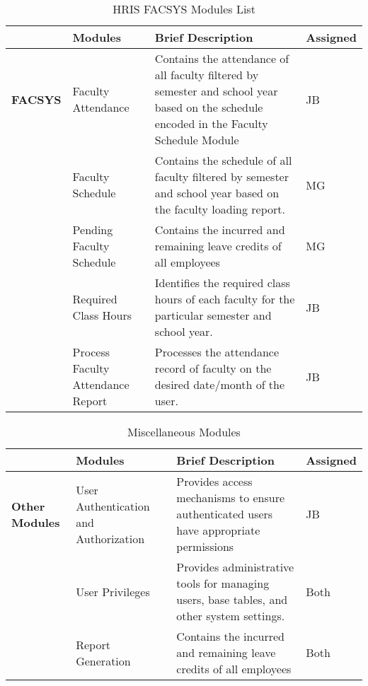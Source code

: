 \begin{table}[H]
    \begin{tabularx}{\textwidth}{|p{2cm}|p{3.5cm}|X|p{1.5cm}|}
    \toprule
    \multicolumn{1}{|l|}{} & \textbf{Modules}               & \textbf{Brief Description}                                                                                                                & \textbf{Assigned} \\ \midrule
    \textbf{FACSYS}     & Faculty Attendance                & Contains the attendance of all faculty filtered by semester and school year based on the schedule encoded in the Faculty Schedule Module  & JB                 \\
                        & Faculty Schedule                  & Contains the schedule of all faculty filtered by semester and school year based on the faculty loading report.                            & MG                 \\
                        & Pending Faculty Schedule          & Contains the incurred and remaining leave credits of all employees                                                                        & MG                 \\
                        & Required Class Hours              & Identifies the required class hours of each faculty for the particular semester and school year.                                          & JB                 \\
                        & Process Faculty Attendance Report & Processes the attendance record of faculty on the desired date/month of the user.                                                         & JB                 \\ \bottomrule
    \end{tabularx}
    \caption{HRIS FACSYS Modules List}
    \label{tab:hris-facsys-modules}
\end{table}

\begin{table}[H]
    \begin{tabularx}{\textwidth}{|p{2cm}|p{3.5cm}|X|p{1.5cm}|}
    \toprule
    \multicolumn{1}{|l|}{}  & \textbf{Modules}                          & \textbf{Brief Description}                                                                     & \textbf{Assigned} \\ \midrule
    \textbf{Other Modules}  & User Authentication and Authorization     & Provides access mechanisms to ensure authenticated users have appropriate permissions          & JB                \\
                            & User Privileges                           & Provides administrative tools for managing users, base tables, and other system settings.      & Both              \\
                            & Report Generation                         & Contains the incurred and remaining leave credits of all employees                             & Both              \\ \bottomrule
    \end{tabularx}
    \caption{Miscellaneous Modules}
    \label{tab:hris-other-modules}
\end{table}
            
    